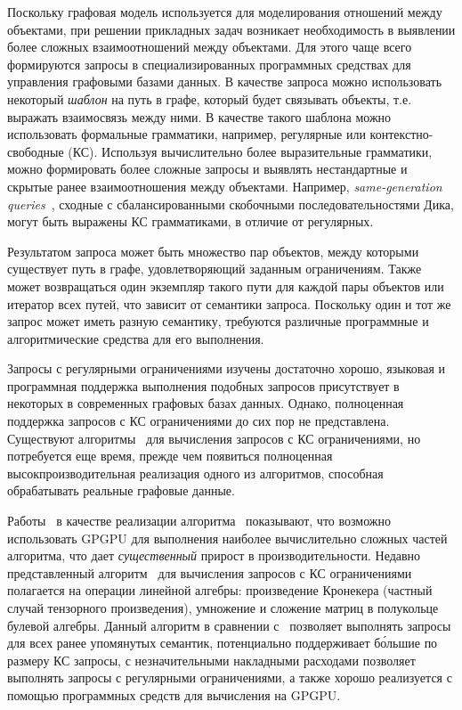 \documentclass[14pt]{matmex-diploma-custom}
\begin{document}
Поскольку графовая модель используется для моделирования отношений между объектами, при решении прикладных задач возникает необходимость в выявлении более сложных взаимоотношений между объектами. Для этого чаще всего формируются запросы в специализированных программных средствах для управления графовыми базами данных. В качестве запроса можно использовать некоторый \textit{шаблон} на путь в графе, который будет связывать объекты, т.е. выражать взаимосвязь между ними. В качестве такого шаблона можно использовать формальные грамматики, например, регулярные или контекстно-свободные (КС). Используя вычислительно более выразительные грамматики, можно формировать более сложные запросы и выявлять нестандартные и скрытые ранее взаимоотношения между объектами. Например, \textit{same-generation queries}~\cite{inbook:databases_intro}, сходные с сбалансированными скобочными последовательностями Дика, могут быть выражены КС грамматиками, в отличие от регулярных.

Результатом запроса может быть множество пар объектов, между которыми существует путь в графе, удовлетворяющий заданным ограничениям. Также может возвращаться один экземпляр такого пути для каждой пары объектов или итератор всех путей, что зависит от семантики запроса. Поскольку один и тот же запрос может иметь разную семантику, требуются различные программные и алгоритмические средства для его выполнения.  

Запросы с регулярными ограничениями изучены достаточно хорошо, языковая и программная поддержка выполнения подобных запросов присутствует в некоторых в современных графовых базах данных. Однако, полноценная поддержка запросов с КС ограничениями до сих пор не представлена. Существуют алгоритмы~\cite{article:cfpq_and_rdf_analysis, article:hellings_cfpq, inproceedings:matrix_cfpq, inbook:kronecker_cfpq_adbis, article:cfpq_go_for_rdf} для вычисления запросов с КС ограничениями, но потребуется еще время, прежде чем появиться полноценная высокпроизводительная реализация одного из алгоритмов, способная обрабатывать реальные графовые данные.

Работы~\cite{inproceedings:cfpq_matrix_evaluation, inproceedings:cfqp_matrix_with_single_source} в качестве реализации алгоритма~\cite{inproceedings:matrix_cfpq} показывают, что возможно использовать GPGPU для выполнения наиболее вычислительно сложных частей алгоритма, что дает \textit{существенный} прирост в производительности. Недавно представленный алгоритм~\cite{inbook:kronecker_cfpq_adbis} для вычисления запросов с КС ограничениями полагается на операции линейной алгебры: произведение Кронекера (частный случай тензорного произведения), умножение и сложение матриц в полукольце булевой алгебры. Данный алгоритм в сравнении с~\cite{inproceedings:matrix_cfpq} позволяет выполнять запросы для всех ранее упомянутых семантик, потенциально поддерживает б\'ольшие по размеру КС запросы, с незначительными накладными расходами позволяет выполнять запросы с регулярными ограничениями, а также хорошо реализуется с помощью программных средств для вычисления на GPGPU.
\end{document}
